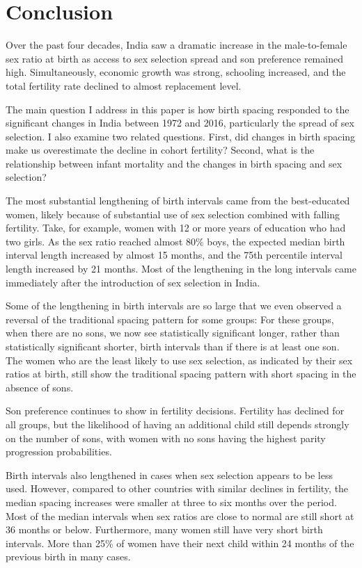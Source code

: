 \documentclass[12pt,letterpaper]{article}
\begin{document}
\section{Conclusion\label{sec:conclusion}}

Over the past four decades, India saw a dramatic increase in the male-to-female
sex ratio at birth as access to sex selection spread and son preference remained high. 
Simultaneously, economic growth was strong, schooling increased, and the total fertility 
rate declined to almost replacement level.

The main question I address in this paper is how birth spacing responded to the 
significant changes in India between 1972 and 2016, particularly the spread of sex 
selection.
I also examine two related questions.
First, did changes in birth spacing make us overestimate the decline in cohort fertility?
Second, what is the relationship between infant mortality and the changes in birth spacing 
and sex selection?


The most substantial lengthening of birth intervals came from the best-educated women,
likely because of substantial use of sex selection combined with falling fertility.
Take, for example, women with 12 or more years of education who had two girls. 
As the sex ratio reached almost 80\% boys, the expected median birth interval length
increased by almost 15 months, and the 75th percentile interval length increased by 21 months.
Most of the lengthening in the long intervals came immediately after the introduction of sex 
selection in India.

Some of the lengthening in birth intervals are so large that we even observed a reversal of
the traditional spacing pattern for some groups: 
For these groups, when there are no sons, we now see statistically significant longer,
rather than statistically significant shorter, birth intervals than if there is at least
one son.
The women who are the least likely to use sex selection, as indicated by their sex ratios
at birth, still show the traditional spacing pattern with short spacing in the absence of
sons.

Son preference continues to show in fertility decisions. 
Fertility has declined for all groups, but the likelihood of having an additional child
still depends strongly on the number of sons, with women with no sons having the highest 
parity progression probabilities.

Birth intervals also lengthened in cases when sex selection appears to be less used.
However, compared to other countries with similar declines in fertility, the median 
spacing increases were smaller at three to six months over the period. 
Most of the median intervals when sex ratios are close to normal are still short at 36 
months or below. 
Furthermore, many women still have very short birth intervals.
More than 25\% of women have their next child within 24 months of the previous birth in 
many cases.  
\end{document}
